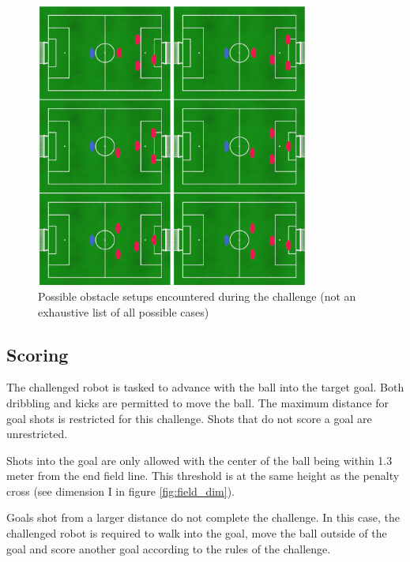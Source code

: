 \begin{figure}[ht]
    \centering
	\includegraphics[width=0.8\textwidth]{figs/obstacle_challenge_2021_a.jpeg}
	\caption{Possible obstacle setups encountered during the challenge (not an exhaustive list of all possible cases)}
	\label{fig:possible_obstacle_setups}
\end{figure}

\subsection{Scoring}

The challenged robot is tasked to advance with the ball into the target goal. Both dribbling and kicks are permitted to move the ball. The maximum distance for goal shots is restricted for this challenge. Shots that do not score a goal are unrestricted.

Shots into the goal are only allowed with the center of the ball being within 1.3 meter from the end field line. This threshold is at the same height as the penalty cross (see dimension I in figure \ref{fig:field_dim}).

Goals shot from a larger distance do not complete the challenge. In this case, the challenged robot is required to walk into the goal, move the ball outside of the goal and score another goal according to the rules of the challenge.

